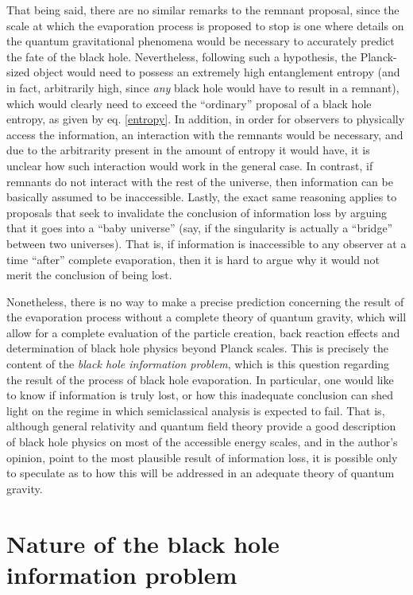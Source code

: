 \documentclass[
12pt,		%
openright,	%
twoside,  %
a4paper,			%
chapter=TITLE,		%
english,			%
french,				%
spanish,			%
brazil				%
]{USPSC-classe/USPSC}
\begin{document}
That being said, there are no similar remarks to the remnant proposal, since the scale at which the evaporation process is proposed to stop is one where details on the quantum gravitational phenomena would be necessary to accurately predict the fate of the black hole. Nevertheless, following such a hypothesis, the Planck-sized object would need to possess an extremely high entanglement entropy (and in fact, arbitrarily high, since \textit{any} black hole would have to result in a remnant), which would clearly need to exceed the ``ordinary'' proposal of a black hole entropy, as given by eq. \ref{entropy}. In addition, in order for observers to physically access the information, an interaction with the remnants would be necessary, and due to the arbitrarity present in the amount of entropy it would have, it is unclear how such interaction would work in the general case. In contrast, if remnants do not interact with the rest of the universe, then information can be basically assumed to be inaccessible. Lastly, the exact same reasoning applies to proposals that seek to invalidate the conclusion of information loss by arguing that it goes into a ``baby universe'' (say, if the singularity is actually a ``bridge'' between two universes). That is, if information is inaccessible to any observer at a time ``after'' complete evaporation, then it is hard to argue why it would not merit the conclusion of being lost.

Nonetheless, there is no way to make a precise prediction concerning the result of the evaporation process without a complete theory of quantum gravity, which will allow for a complete evaluation of the particle creation, back reaction effects and determination of black hole physics beyond Planck scales. This is precisely the content of the \textit{black hole information problem}, which is this question regarding the result of the process of black hole evaporation. In particular, one would like to know if information is truly lost, or how this inadequate conclusion can shed light on the regime in which semiclassical analysis is expected to fail. That is, although general relativity and quantum field theory provide a good description of black hole physics on most of the accessible energy scales, and in the author's opinion, point to the most plausible result of information loss, it is possible only to speculate as to how this will be addressed in an adequate theory of quantum gravity.

\section{Nature of the black hole information problem}\label{nature}
\end{document}

